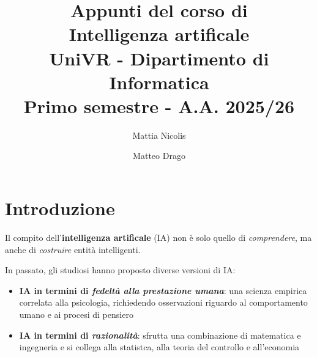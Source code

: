 \documentclass[12pt, a4paper, oneside]{book}
\title{\Huge\bfseries Appunti del corso di \\[0.5ex]
\textcolor{azzurrino}{Intelligenza artificale} \\[1ex]
\Large UniVR - Dipartimento di Informatica \\[1.5ex]
\Large Primo semestre - A.A. 2025/26}
\author{\Large Mattia Nicolis \and  \Large Matteo Drago}
\date{}
\begin{document}
    \frontmatter
    \maketitle
    \tableofcontents
    \thispagestyle{empty}
    \newpage

    \mainmatter

    \chapter{Introduzione}
    Il compito dell'\textbf{intelligenza artificale} (IA) non è solo quello di \textit{comprendere}, ma anche di \textit{costruire} entità intelligenti.
    
    

    In passato, gli studiosi hanno proposto diverse versioni di IA:
    \begin{itemize}
        \item \textbf{IA in termini di \textit{fedeltà alla prestazione umana}}: una scienza empirica correlata alla psicologia, richiedendo osservazioni riguardo al comportamento umano e ai procesi di pensiero 
        \item \textbf{IA in termini di \textit{razionalità}}: sfrutta una combinazione di matematica e ingegneria e si collega alla statistca, alla teoria del controllo e all'economia
    \end{itemize}
\end{document}
